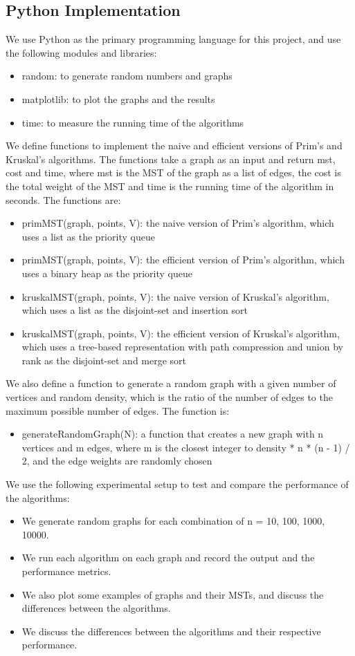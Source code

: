 \documentclass[a4paper, 10pt, twocolumn]{article}
\begin{document}
\subsection{Python Implementation}
We use Python as the primary programming language for this project, and use the following modules and libraries:
\begin{itemize}
    \item random: to generate random numbers and graphs
    \item matplotlib: to plot the graphs and the results
    \item time: to measure the running time of the algorithms
\end{itemize}
We define functions to implement the naive and efficient versions of Prim’s and Kruskal’s algorithms. The functions take a graph as an input and return mst, cost and time, where mst is the MST of the graph as a list of edges, the cost is the total weight of the MST and time is the running time of the algorithm in seconds. The functions are:
\begin{itemize}
    \item primMST(graph, points, V): the naive version of Prim’s algorithm, which uses a list as the priority queue
    \item primMST(graph, points, V): the efficient version of Prim’s algorithm, which uses a binary heap as the priority queue
    \item kruskalMST(graph, points, V): the naive version of Kruskal’s algorithm, which uses a list as the disjoint-set and insertion sort
    \item kruskalMST(graph, points, V): the efficient version of Kruskal’s algorithm, which uses a tree-based representation with path compression and union by rank as the disjoint-set and merge sort
\end{itemize}
We also define a function to generate a random graph with a given number of vertices and random density, which is the ratio of the number of edges to the maximum possible number of edges. The function is:
\begin{itemize}
    \item generateRandomGraph(N): a function that creates a new graph with n vertices and m edges, where m is the closest integer to density * n * (n - 1) / 2, and the edge weights are randomly chosen
\end{itemize}
We use the following experimental setup to test and compare the performance of the algorithms:
\begin{itemize}
    \item We generate random graphs for each combination of n = 10, 100, 1000, 10000.
    \item We run each algorithm on each graph and record the output and the performance metrics.
    \item We also plot some examples of graphs and their MSTs, and discuss the differences between the algorithms.
    \item We discuss the differences between the algorithms and their respective performance.
\end{itemize}
\end{document}
